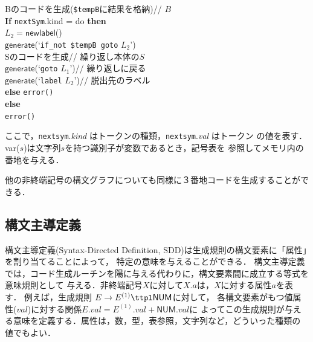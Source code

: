 \documentclass[dvipdfmx,a4j]{jbook}
\begin{document}
\begin{Exmp}
\begin{center}
\begin{mdframed}[userdefinedwidth=.8\linewidth]
\begin{tabbing}
\> Bのコードを生成(\verb|$tempB|に結果を格納)\>\>// $B$\\
\> {\rm\bf If} \verb|nextSym|.kind = {\sf do} {\rm\bf then}\\
\>\> $L_2=\mathsf{newlabel}$()\\
\>\> $\mathsf{generate}$(`\verb|if_not|\ \verb|$tempB|\ \verb|goto| $L_2$')\\
\>\> Sのコードを生成\>// 繰り返し本体の$S$\\
\>\> $\mathsf{generate}$(`\verb|goto| $L_1$')\>// 繰り返しに戻る\\
\>\> $\mathsf{generate}$(`\verb|label| $L_2$')\>// 脱出先のラベル\\
\> {\rm\bf else} \verb|error()|\\
{\rm\bf else}\\
\>\verb|error()|
\end{tabbing}
\end{mdframed}
\end{center}
\end{Exmp}

ここで，\verb|nextsym|.{\it kind} はトークンの種類，\verb|nextsym|.{\it val} はトークン
の値を表す．{\sf var}($s$)は文字列$s$を持つ識別子が変数であるとき，記号表を
参照してメモリ内の番地を与える．

他の非終端記号の構文グラフについても同様に３番地コードを生成することができる．

\subsection{構文主導定義}

構文主導定義(Syntax-Directed Definition, SDD)は生成規則の構文要素に「属性」を割り当てることによって，
特定の意味を与えることができる．
構文主導定義では，コード生成ルーチンを陽に与える代わりに，構文要素間に成立する等式を意味規則として
与える．非終端記号$X$に対して$X.a$は，$X$に対する属性$a$を表す．
例えば，生成規則 $E\rightarrow E^{(1)}\ttpl\mathsf{NUM}$に対して，
各構文要素がもつ値属性($val$)に対する関係$E.val=E^{(1)}.val+\mathsf{NUM}.val$に
よってこの生成規則が与える意味を定義する．属性は，数，型，表参照，文字列など，どういった種類の
値でもよい．
\end{document}
